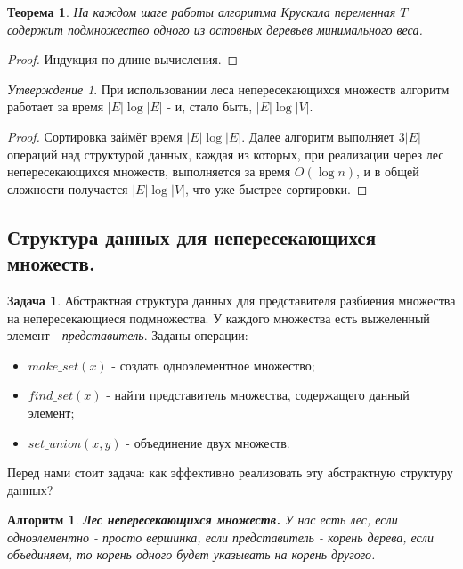 \documentclass[a4paper]{article}
\theoremstyle{indented}
\newtheorem{theorem}{Теорема}
\newtheorem{alg}{Алгоритм}
\theoremstyle{definition}
\newtheorem{prob}{Задача}
\theoremstyle{remark}
\newtheorem{stat}{Утверждение}
\begin{document}
\begin{theorem}
    На каждом шаге работы алгоритма Крускала переменная $T$ содержит подмножество одного из остовных деревьев минимального веса.
\end{theorem}

\begin{proof}
    Индукция по длине вычисления.
\end{proof}

\begin{stat}
    При использовании леса непересекающихся множеств алгоритм работает за время $|E|\log |E|$ - и, стало быть, $|E|\log |V|$. 
\end{stat}

\begin{proof}
    Сортировка займёт время $|E|\log |E|$. Далее алгоритм выполняет $3|E|$ операций над структурой данных, каждая из которых, при реализации через лес непересекающихся множеств, выполняется за время $O(\log n)$, и в общей сложности получается $|E|\log |V|$, что уже быстрее сортировки.
\end{proof}

\subsection{Структура данных для непересекающихся множеств.}

\begin{prob}
    Абстрактная структура данных для представителя разбиения множества на непересекающиеся подмножества. У каждого множества есть выжеленный элемент - \textit{представитель}. Заданы операции:

    \begin{itemize}
        \item $make\_set(x)$ - создать одноэлементное множество; 
        \item $find\_set(x)$ - найти представитель множества, содержащего данный элемент; 
        \item $set\_union(x, y)$ - объединение двух множеств.
    \end{itemize}

    Перед нами стоит задача: как эффективно реализовать эту абстрактную структуру данных?
\end{prob}

\begin{alg}
    \textbf{Лес непересекающихся множеств.} У нас есть лес, если одноэлементно - просто вершинка, если представитель - корень дерева, если объединяем, то корень одного будет указывать на корень другого.
\end{alg}
\end{document}
